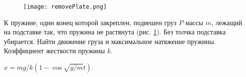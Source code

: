 \begin{figure}[h]
\centering
\texttt{[image: removePlate.png]}
\caption{}
\label{removePlate}
\end{figure}

\begin{ex} %
К пружине, один конец которой закреплен, подвешен груз $P$ массы $m$, лежащий на подставке так, что пружина не растянута (рис. \ref{removePlate}). Без толчка подставка убирается. Найти движение груза и максимальное натяжение пружины. Коэффициент жесткости пружины $k$.
\begin{ans}
$x = mg/k(1-\cos \sqrt{g/m} t)$.
\end{ans}
\end{ex}	

\clearpage